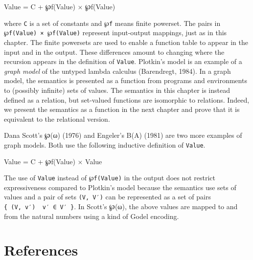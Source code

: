 \begin{myDisplay}
Value = C + ℘f(Value) × ℘f(Value)
\end{myDisplay}

where \texttt{C} is a set of constants and \texttt{℘f} means finite
powerset. The pairs in \texttt{℘f(Value)\ ×\ ℘f(Value)} represent
input-output mappings, just as in this chapter. The finite powersets are
used to enable a function table to appear in the input and in the
output. These differences amount to changing where the recursion appears
in the definition of \texttt{Value}. Plotkin's model is an example of a
\emph{graph model} of the untyped lambda calculus (Barendregt, 1984). In
a graph model, the semantics is presented as a function from programs
and environments to (possibly infinite) sets of values. The semantics in
this chapter is instead defined as a relation, but set-valued functions
are isomorphic to relations. Indeed, we present the semantics as a
function in the next chapter and prove that it is equivalent to the
relational version.

Dana Scott's ℘(ω) (1976) and Engeler's B(A) (1981) are two more examples
of graph models. Both use the following inductive definition of
\texttt{Value}.

\begin{myDisplay}
Value = C + ℘f(Value) × Value
\end{myDisplay}

The use of \texttt{Value} instead of \texttt{℘f(Value)} in the output
does not restrict expressiveness compared to Plotkin's model because the
semantics use sets of values and a pair of sets \texttt{(V,\ V′)} can be
represented as a set of pairs
\texttt{\{\ (V,\ v′)\ \textbar{}\ v′\ ∈\ V′\ \}}. In Scott's ℘(ω), the
above values are mapped to and from the natural numbers using a kind of
Godel encoding.

\hypertarget{references}{%
\section{References}\label{references}}

